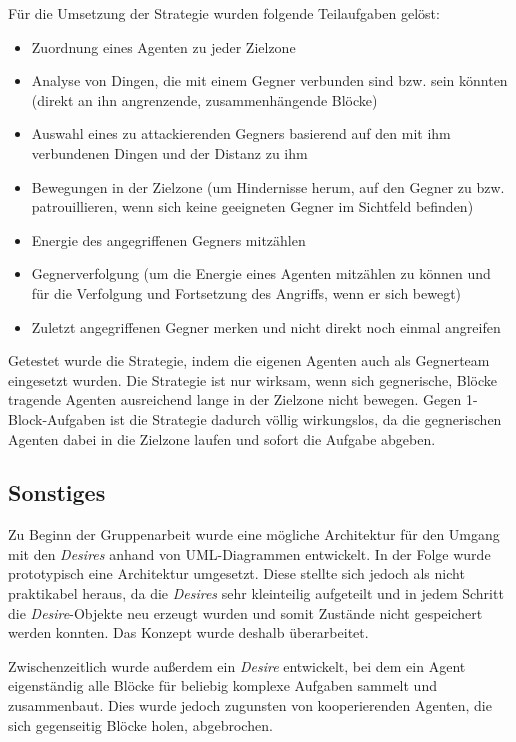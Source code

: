 \documentclass[runningheads]{llncs}
\begin{document}
	Für die Umsetzung der Strategie wurden folgende Teilaufgaben gelöst:
	\begin{itemize}
		\item{Zuordnung eines Agenten zu jeder Zielzone}
		\item{Analyse von Dingen, die mit einem Gegner verbunden sind bzw. sein könnten (direkt an ihn angrenzende, zusammenhängende Blöcke)}
		\item{Auswahl eines zu attackierenden Gegners basierend auf den mit ihm verbundenen Dingen und der Distanz zu ihm}
		\item{Bewegungen in der Zielzone (um Hindernisse herum, auf den Gegner zu bzw. patrouillieren, wenn sich keine geeigneten Gegner im Sichtfeld befinden)}
		\item{Energie des angegriffenen Gegners mitzählen}
		\item{Gegnerverfolgung (um die Energie eines Agenten mitzählen zu können und für die Verfolgung und Fortsetzung des Angriffs, wenn er sich bewegt)}
		\item{Zuletzt angegriffenen Gegner merken und nicht direkt noch einmal angreifen}
	\end{itemize}
	
	Getestet wurde die Strategie, indem die eigenen Agenten auch als Gegnerteam eingesetzt wurden. Die Strategie ist nur wirksam, wenn sich gegnerische, Blöcke tragende Agenten ausreichend lange in der Zielzone nicht bewegen. Gegen 1-Block-Aufgaben ist die Strategie dadurch völlig wirkungslos, da die gegnerischen Agenten dabei in die Zielzone laufen und sofort die Aufgabe abgeben.
	
	\subsection{Sonstiges}
	Zu Beginn der Gruppenarbeit wurde eine mögliche Architektur für den Umgang mit den \textit{Desires} anhand von UML-Diagrammen entwickelt. In der Folge wurde prototypisch eine Architektur umgesetzt. Diese stellte sich jedoch als nicht praktikabel heraus, da die \textit{Desires} sehr kleinteilig aufgeteilt und in jedem Schritt die \textit{Desire}-Objekte neu erzeugt wurden und somit Zustände nicht gespeichert werden konnten. Das Konzept wurde deshalb überarbeitet.
	
	Zwischenzeitlich wurde außerdem ein \textit{Desire} entwickelt, bei dem ein Agent eigenständig alle Blöcke für beliebig komplexe Aufgaben sammelt und zusammenbaut. Dies wurde jedoch zugunsten von kooperierenden Agenten, die sich gegenseitig Blöcke holen, abgebrochen.
	
\end{document}
